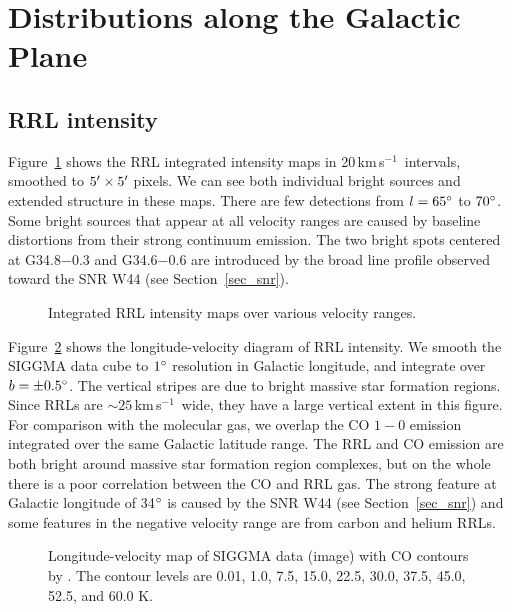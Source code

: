 \documentclass[manuscript]{aastex61}
\newcommand{\kms}{\,km\,s$^{-1}$}
\begin{document}
\section{Distributions along the Galactic Plane} \label{sec_gal}
\subsection{RRL intensity} \label{sec_gal_rrl}
Figure~\ref{fig_rrl_map} shows the RRL integrated intensity maps in 20\kms\ intervals, smoothed to $5\mbox{$^\prime$} \times 5\mbox{$^\prime$}$ pixels.
We can see both individual bright sources and extended structure in these maps.
There are few detections from $l=65\mbox{$^\circ$}$ to $70\mbox{$^\circ$}$. 
Some bright sources that appear at all velocity ranges are caused by baseline distortions from their strong continuum emission.
The two bright spots centered at G34.8$-$0.3 and G34.6$-$0.6 are introduced by the broad line profile observed toward the SNR W44 (see Section~\ref{sec_snr}).

\begin{figure}[htbp]
\caption{Integrated RRL intensity maps over various velocity ranges.
}\label{fig_rrl_map}
\end{figure}

Figure~\ref{lv_map} shows the longitude-velocity diagram of RRL intensity.
We smooth the SIGGMA data cube to $1\mbox{$^\circ$}$ resolution in Galactic longitude, and integrate over $b = \pm 0.5 \mbox{$^\circ$}$.
The vertical stripes are due to bright massive star formation regions.  Since RRLs are $\sim25$\kms\ wide, they have a large vertical extent in this figure.
For comparison with the molecular gas, we overlap the CO $1-0$ emission \citep{Dame2001} integrated over the same Galactic latitude range.
The RRL and CO emission are both bright around massive star formation region complexes, but on the whole there is a poor correlation between the CO and RRL gas.
The strong feature at Galactic longitude of 34$\mbox{$^\circ$}$ is caused by the SNR W44 (see Section~\ref{sec_snr}) and some features in the negative velocity range are from carbon and helium RRLs.
\begin{figure}[htbp]
\centering
{}
\caption{Longitude-velocity map of  SIGGMA data (image) with CO contours by \citep{Dame2001}. The contour levels are 0.01, 1.0, 7.5, 15.0, 22.5, 30.0, 37.5, 45.0, 52.5, and 60.0 K.}\label{lv_map}
\end{figure}
\end{document}
